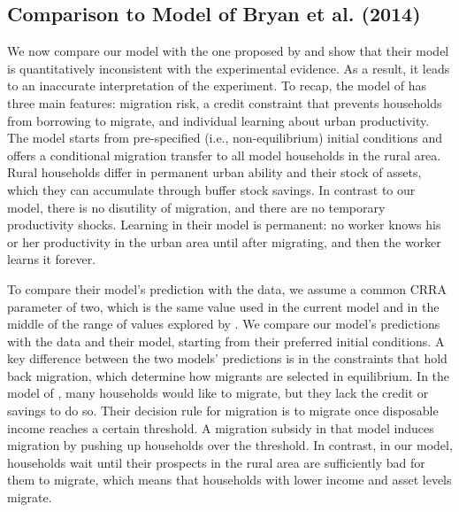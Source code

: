 \documentclass[12pt,pdftex]{article}
\begin{document}

\subsection{Comparison to Model of Bryan et al. (2014) \label{sec:bcm_lmw}}

We now compare our model with the one proposed by \citet{brch14} and show that their model is quantitatively inconsistent with the experimental evidence. As a result, it leads to an inaccurate interpretation of the experiment. To recap, the model of \citet{brch14} has three main features: migration risk, a credit constraint that prevents households from borrowing to migrate, and individual learning about urban productivity. The model starts from pre-specified (i.e., non-equilibrium) initial conditions and offers a conditional migration transfer to all model households in the rural area. Rural households differ in permanent urban ability and their stock of assets, which they can accumulate through buffer stock savings. In contrast to our model, there is no disutility of migration, and there are no temporary productivity shocks. Learning in their model is permanent: no worker knows his or her productivity in the urban area until after migrating, and then the worker learns it forever.

To compare their model's prediction with the data, we assume a common CRRA parameter of two, which is the same value used in the current model and in the middle of the range of values explored by \citet{brch14}. We compare our model's predictions with the data and their model, starting from their preferred initial conditions. A key difference between the two models' predictions is in the constraints that hold back migration, which determine how migrants are selected in equilibrium. In the model of \citet{brch14}, many households would like to migrate, but they lack the credit or savings to do so. Their decision rule for migration is to migrate once disposable income reaches a certain threshold. A migration subsidy in that model induces migration by pushing up households over the threshold. In contrast, in our model, households wait until their prospects in the rural area are sufficiently bad for them to migrate, which means that households with lower income and asset levels migrate.
\end{document}
